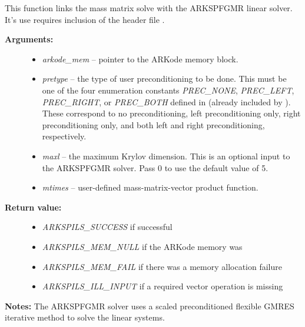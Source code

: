 \documentclass[letterpaper,10pt,english]{sphinxmanual}
\begin{document}

\begin{fulllineitems}
\label{c_interface/User_callable:ARKMassSpfgmr}
This function links the mass matrix solve with the ARKSPFGMR linear
solver.  It's use requires inclusion of the header file
.
\begin{description}
\item[{\textbf{Arguments:}}] \leavevmode\begin{itemize}
\item {} 
\emph{arkode\_mem} -- pointer to the ARKode memory block.

\item {} 
\emph{pretype} -- the type of user preconditioning to be done.  This
must be one of the four enumeration constants \emph{PREC\_NONE},
\emph{PREC\_LEFT}, \emph{PREC\_RIGHT}, or \emph{PREC\_BOTH} defined in
 (already included by
). These correspond to no preconditioning,
left preconditioning only, right preconditioning only, and
both left and right preconditioning, respectively.

\item {} 
\emph{maxl} -- the maximum Krylov dimension. This is an optional input
to the ARKSPFGMR solver. Pass 0 to use the default value of 5.

\item {} 
\emph{mtimes} -- user-defined mass-matrix-vector product function.

\end{itemize}

\item[{\textbf{Return value:}}] \leavevmode\begin{itemize}
\item {} 
\emph{ARKSPILS\_SUCCESS} if successful

\item {} 
\emph{ARKSPILS\_MEM\_NULL}  if the ARKode memory was 

\item {} 
\emph{ARKSPILS\_MEM\_FAIL}  if there was a memory allocation failure

\item {} 
\emph{ARKSPILS\_ILL\_INPUT} if a required vector operation is missing

\end{itemize}

\end{description}

\textbf{Notes:} The ARKSPFGMR solver uses a scaled preconditioned
flexible GMRES iterative method to solve the linear systems.

\end{fulllineitems}
\end{document}
